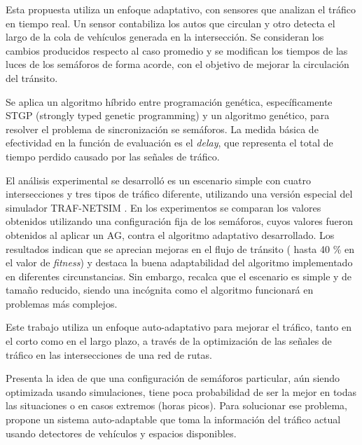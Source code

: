\begin{itemize}
\begin{item}

Esta propuesta utiliza un enfoque adaptativo, con sensores que analizan el tráfico en tiempo real. Un sensor contabiliza los autos que circulan y otro detecta el largo de la cola de vehículos generada en la intersección. Se consideran los cambios producidos respecto al caso promedio y se modifican los tiempos de las luces de los semáforos de forma acorde, con el objetivo de mejorar la circulación del tránsito. 

Se aplica un algoritmo híbrido entre programación genética, específicamente STGP (strongly typed genetic programming) \citep{Montana1995} y un algoritmo genético, para resolver el problema de sincronización se semáforos. La medida básica de efectividad en la función de evaluación es el \emph{delay}, que representa el total de tiempo perdido causado por las señales de tráfico. 

El análisis experimental se desarrolló es un escenario simple con cuatro intersecciones y tres tipos de tráfico diferente, utilizando una versión especial del simulador TRAF-NETSIM \citep{TRAF-NETSIM}. En los experimentos se comparan los valores obtenidos utilizando una configuración fija de los semáforos, cuyos valores fueron obtenidos al aplicar un AG, contra el algoritmo adaptativo desarrollado. Los resultados indican que se aprecian mejoras en el flujo de tránsito ( hasta 40 \% en el valor de \emph{fitness})  y destaca la buena adaptabilidad del algoritmo implementado en diferentes circunstancias. Sin embargo, recalca que el escenario es simple y de tamaño reducido, siendo una incógnita como el algoritmo funcionará en problemas más complejos.

\end{item}	


\begin{item}

Este trabajo utiliza un enfoque auto-adaptativo para mejorar el tráfico, tanto en el corto como en el largo plazo, a través de la optimización de las señales de tráfico en las intersecciones de una red de rutas. 

Presenta la idea de que una configuración de semáforos particular, aún siendo optimizada usando simulaciones, tiene poca probabilidad de ser la mejor en todas las situaciones o en casos extremos (horas picos). Para solucionar ese problema, propone un sistema auto-adaptable que toma la información del tráfico actual usando detectores de vehículos y espacios disponibles.


\end{item}
\end{itemize}
